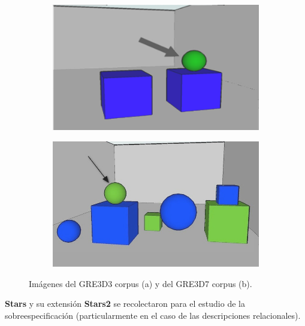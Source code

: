 \begin{figure}[!ht]
\begin{subfigure}{.5\textwidth}
\centering
\includegraphics[width=\textwidth]{images/GRE3D3.png}\\[0pt]
\caption{}
\label{fig-GRE3D3}
\end{subfigure}
\hspace*{0cm}
\begin{subfigure}{.5\textwidth}

\centering
\includegraphics[width=\textwidth]{images/3.jpg}\\[0pt]
\caption{}
\label{fig-GRE3D7-chapter2}
\end{subfigure}
\caption{Im\'agenes del GRE3D3 corpus (a) y del GRE3D7 corpus (b).}\label{imagenes-GRE3D3-GRE3D7}
\end{figure}

\label{sec:corpusSTARS}

{\bf Stars} y su extensi\'on {\bf Stars2} \cite{Paraboni2016} se recolectaron para el estudio de la sobreespecificaci\'on (particularmente en el caso de las descripciones relacionales). 

